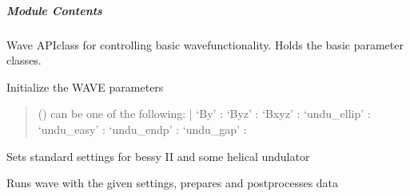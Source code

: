 \documentclass[letterpaper,10pt,english]{sphinxmanual}
\begin{document}
\subparagraph{Module Contents}
\label{\detokenize{autoapi/unduwave/api/wave_api_root/index:module-contents}}

\begin{fulllineitems}
\label{\detokenize{autoapi/unduwave/api/wave_api_root/index:unduwave.api.wave_api_root.wave_api}}
\pysigstartsignatures
{}
\pysigstopsignatures
\sphinxAtStartPar
Wave API\sphinxhyphen{}class for controlling basic wave\sphinxhyphen{}functionality.
Holds the basic parameter classes.

\sphinxAtStartPar
Initialize the WAVE parameters
\begin{quote}\begin{description}
\sphinxAtStartPar
{} () \textendash{} can be one of the following: |
‘By’ :
‘Byz’ :
‘Bxyz’ :
‘undu\_ellip’ :
‘undu\_easy’ :
‘undu\_endp’ :
‘undu\_gap’ :

\end{description}\end{quote}

\begin{fulllineitems}
\label{\detokenize{autoapi/unduwave/api/wave_api_root/index:unduwave.api.wave_api_root.wave_api.set_bessy_II_elliptical_undu}}
\pysigstartsignatures
{}
\pysigstopsignatures
\sphinxAtStartPar
Sets standard settings for bessy II and some helical undulator

\end{fulllineitems}


\begin{fulllineitems}
\label{\detokenize{autoapi/unduwave/api/wave_api_root/index:unduwave.api.wave_api_root.wave_api.run}}
\pysigstartsignatures
{}
\pysigstopsignatures
\sphinxAtStartPar
Runs wave with the given settings, prepares and postprocesses data


\end{fulllineitems}
\end{fulllineitems}
\end{document}
